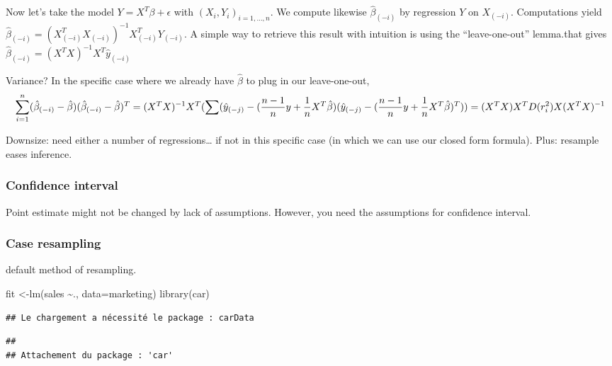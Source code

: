 \documentclass[
]{article}
\newenvironment{Shaded}{\begin{snugshade}}{\end{snugshade}}
\newcommand{\AttributeTok}[1]{\textcolor[rgb]{0.77,0.63,0.00}{#1}}
\newcommand{\FunctionTok}[1]{\textcolor[rgb]{0.00,0.00,0.00}{#1}}
\newcommand{\NormalTok}[1]{#1}
\newcommand{\OtherTok}[1]{\textcolor[rgb]{0.56,0.35,0.01}{#1}}
\newcommand{\SpecialCharTok}[1]{\textcolor[rgb]{0.00,0.00,0.00}{#1}}
\begin{document}
Now let's take the model \(Y=X^T\beta+\epsilon\) with
\((X_i, Y_i)_{i=1,\dots, n}\). We compute likewise
\(\hat{\beta}_{(-i)}\) by regression \(Y\) on \(X_{(-i)}\). Computations
yield
\(\hat{\beta}_{(-i)}=(X_{(-i)}^TX_{(-i)})^{-1}X_{(-i)}^T Y_{(-i)}\). A
simple way to retrieve this result with intuition is using the
``leave-one-out'' lemma.that gives
\(\hat{\beta}_{(-i)}=(X^T X)^{-1}X^T\hat{y}_{(-i)}\)

Variance? In the specific case where we already have \(\hat{\beta}\) to
plug in our leave-one-out,
\[\sum_{i=1}^n (\hat{\beta}_{(-i)}-\hat{\beta})(\hat{\beta}_{(-i)}-\hat{\beta})^T 
=(X^TX)^{-1}X^T(\sum (\hat{y}_{(-j)}-(\frac{n-1}{n}y+\frac{1}{n}X^T\hat{\beta})(\hat{y}_{(-j)}-(\frac{n-1}{n}y+\frac{1}{n}X^T\hat{\beta})^T))\\
=(X^T X)X^T D(r_i^2) X(X^T X)^{-1}\]

Downsize: need either a number of regressions\ldots{} if not in this
specific case (in which we can use our closed form formula). Plus:
resample eases inference.

\hypertarget{confidence-interval}{%
\subsubsection{Confidence interval}\label{confidence-interval}}

Point estimate might not be changed by lack of assumptions. However, you
need the assumptions for confidence interval.

\hypertarget{case-resampling}{%
\subsubsection{Case resampling}\label{case-resampling}}

default method of resampling.

\begin{Shaded}
\begin{Highlighting}[]
\NormalTok{fit }\OtherTok{\textless{}{-}}\FunctionTok{lm}\NormalTok{(sales }\SpecialCharTok{\textasciitilde{}}\NormalTok{., }\AttributeTok{data=}\NormalTok{marketing)}
\FunctionTok{library}\NormalTok{(car)}
\end{Highlighting}
\end{Shaded}

\begin{verbatim}
## Le chargement a nécessité le package : carData
\end{verbatim}

\begin{verbatim}
## 
## Attachement du package : 'car'
\end{verbatim}
\end{document}
